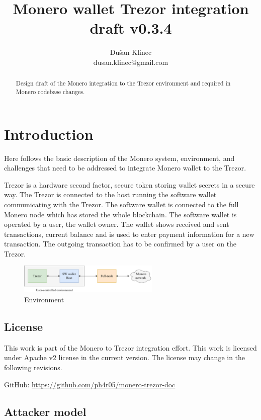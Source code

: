 \documentclass[]{article}
\title{Monero wallet Trezor integration draft v0.3.4}
\author{Du\v{s}an Klinec \\{dusan.klinec@gmail.com}}
\begin{document}
	
\maketitle

\begin{abstract}
	Design draft of the Monero integration to the Trezor environment and required in Monero codebase changes.
\end{abstract}

\section{Introduction}
Here follows the basic description of the Monero system, environment, and challenges that need to be addressed to integrate Monero wallet to the Trezor.

Trezor is a hardware second factor, secure token storing wallet secrets in a secure way. 
The Trezor is connected to the host running the software wallet communicating with the Trezor. The software wallet is connected to the full Monero node which has stored the whole blockchain. The software wallet is operated by a user, the wallet owner. The wallet shows received and sent transactions, current balance and is used to enter payment information for a new transaction. The outgoing transaction has to be confirmed by a user on the Trezor.

\begin{figure}[h]
	\centering
	\includegraphics[width=0.6\textwidth, angle=0]{img/trezord.pdf}
	\caption{Environment}
\end{figure}


\subsection{License}
This work is part of the Monero to Trezor integration effort. This work is licensed under Apache v2 license in the current version. The license may change in the following revisions.

GitHub: \url{https://github.com/ph4r05/monero-trezor-doc} 

\subsection{Attacker model}
\end{document}

